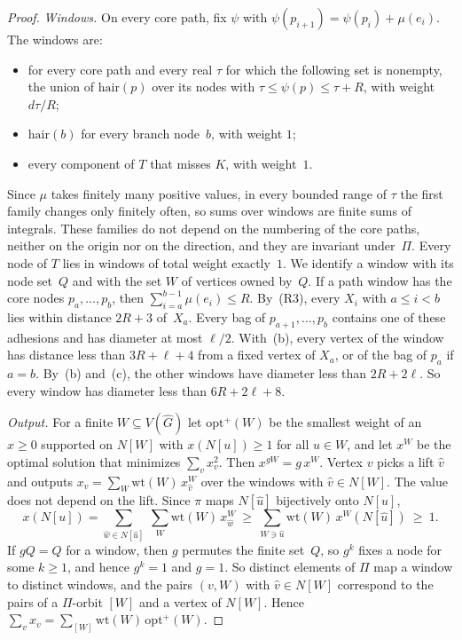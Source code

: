 \documentclass[11pt]{article}
\theoremstyle{remark}
\begin{document}
\begin{proof}
\emph{Windows.} On every core path, fix $\psi$ with $\psi(p_{i+1})=\psi(p_i)+\mu(e_i)$. The windows are:
\begin{itemize}
\item for every core path and every real $\tau$ for which the following set is nonempty, the union
  of $\mathrm{hair}(p)$ over its nodes with $\tau\le\psi(p)\le\tau+R$, with weight $d\tau/R$;
\item $\mathrm{hair}(b)$ for every branch node~$b$, with weight $1$;
\item every component of $T$ that misses $K$, with weight~$1$.
\end{itemize}
Since $\mu$ takes finitely many positive values, in every bounded range of $\tau$ the first family
changes only finitely often, so sums over windows
are finite sums of integrals. These families do not depend on the numbering of the core paths,
neither on the origin nor on the direction, and they are invariant under~$\Pi$. Every node of $T$
lies in windows of total weight exactly~$1$. We identify a window with its node set~$Q$ and with the
set $W$ of vertices owned by~$Q$. If a path window has the core nodes $p_a,\dots,p_b$, then
$\sum_{i=a}^{b-1}\mu(e_i)\le R$. By~(R3), every $X_i$ with $a\le i<b$ lies within distance $2R+3$
of~$X_a$. Every bag of $p_{a+1},\dots,p_b$ contains one of these adhesions and has diameter at most
$\ell/2$. With~(b), every vertex of the window has distance less than $3R+\ell+4$ from a fixed vertex
of $X_a$, or of the bag of $p_a$ if $a=b$. By~(b) and~(c), the other windows have diameter less than
$2R+2\ell$. So every window has diameter less than $6R+2\ell+8$.

\emph{Output.} For a finite $W\subseteq V(\hat G)$ let $\mathrm{opt}^+(W)$ be the smallest weight of an
$x\ge0$ supported on $N[W]$ with $x(N[u])\ge1$ for all $u\in W$, and let $x^W$ be the optimal
solution that minimizes $\sum_vx_v^2$. Then $x^{gW}=g\,x^W$. Vertex $v$ picks a lift $\hat v$ and
outputs $x_v=\sum_W\mathrm{wt}(W)\,x^W_{\hat v}$ over the windows with $\hat v\in N[W]$. The value
does not depend on the lift. Since $\pi$ maps $N[\hat u]$ bijectively onto $N[u]$,
\[
  x(N[u])=\sum_{\hat w\in N[\hat u]}\ \sum_W\mathrm{wt}(W)\,x^W_{\hat w}\ \ge\
  \sum_{W\ni\hat u}\mathrm{wt}(W)\,x^W(N[\hat u])\ \ge\ 1.
\]
If $gQ=Q$ for a window, then $g$ permutes the finite set~$Q$, so $g^k$ fixes a node for some
$k\ge1$, and hence $g^k=1$ and $g=1$. So distinct elements of $\Pi$ map a window to distinct windows,
and the pairs $(v,W)$ with $\hat v\in N[W]$ correspond to the pairs of a $\Pi$-orbit $[W]$ and a
vertex of $N[W]$. Hence
$\sum_vx_v=\sum_{[W]}\mathrm{wt}(W)\,\mathrm{opt}^+(W)$.


\end{proof}
\end{document}
